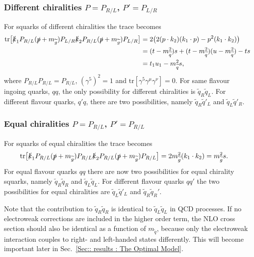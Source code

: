 \documentclass[twoside,english]{uiofysmaster}
\begin{document}
{\subsubsection{Different chiralities $P=P_{R/L}$, $P'=P_{L/R}$}
For squarks of different chiralities the trace becomes
\begin{align*}
\text{tr} \big[ 
\slashed{k}_1 P_{R/L} (\slashed{p} + m_{\widetilde{g}}) P_{L/R} \slashed{k}_2 P_{R/L} (\slashed{p} + m_{\widetilde{g}}) P_{L/R} \big]
&= 2 \big(
2 (p \cdot k_2) (k_1 \cdot p) - p^2 (k_1 \cdot k_2)\big)\\
& = (t-m_{\widetilde{q}}^2)s + (t-m_{\widetilde{q}}^2)(u-m_{\widetilde{q}}^2)-  ts\\
&=  t_1u_1 -m_{\widetilde{q}}^2s,
\end{align*}
where $P_{R/L}P_{R/L} = P_{R/L}$, $(\gamma^5)^2 = 1$ and $\text{tr}[\gamma^5 \gamma^{\mu} \gamma^{\nu}]=0$. For same flavour ingoing quarks, $qq$, the only possibility for different chiralities is $\widetilde{q}_R\widetilde{q}_L$. For different flavour quarks, $q'q$, there are two possibilities, namely $ \widetilde{q}_R \widetilde{q}'_L$ and $\widetilde{q}_L \widetilde{q}'_R$.  


\subsubsection{Equal chiralities $P=P_{R/L}$, $P'=P_{R/L}$}
For squarks of equal chiralities the trace becomes
\begin{align*}
\text{tr} \big[ 
\slashed{k}_1 P_{R/L} (\slashed{p} + m_{\widetilde{g}}) P_{R/L} \slashed{k}_2 P_{R/L} (\slashed{p} + m_{\widetilde{g}}) P_{R/L} \big]&= 2  m_{\widetilde{g}}^2 (k_1 \cdot k_2)= m_{\widetilde{g}}^2 s.
\end{align*}
For equal flavour quarks $qq$ there are now two possibilities for equal chirality squarks, namely $\widetilde{q}_R \widetilde{q}_R$ and $ \widetilde{q}_L \widetilde{q}_L$. For different flavour quarks $qq'$ the two possibilities for equal chiralities are $ \widetilde{q}_L \widetilde{q}'_L$ and $\widetilde{q}_R \widetilde{q}_R'$. 

Note that the contribution to $\widetilde{q}_R \widetilde{q}_R$ is identical to $\widetilde{q}_L \widetilde{q}_L$ in QCD processes. If no electroweak corrections are included in the higher order term, the NLO cross section should also be identical as a function of $m_{\widetilde{q}}$, because only the electroweak interaction couples to right- and left-handed states differently. This will become important later in Sec.~\ref{Sec:: results : The Optimal Model}.

}
\end{document}
